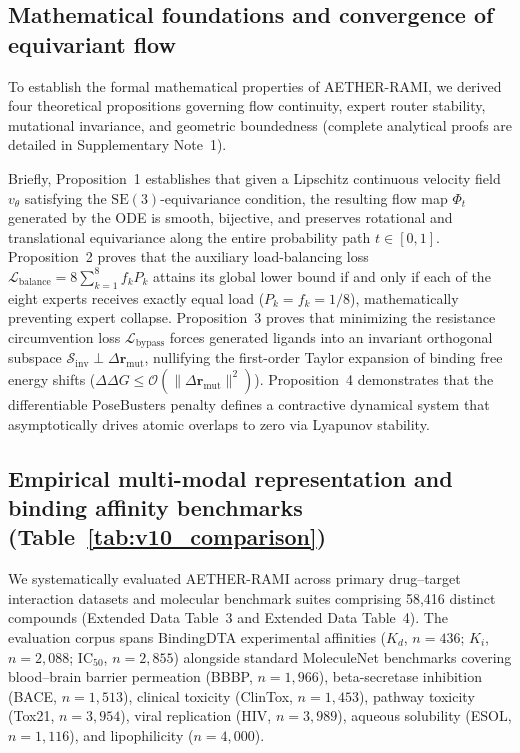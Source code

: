 \documentclass[11pt,a4paper]{article}
\begin{document}
\subsection*{Mathematical foundations and convergence of equivariant flow}
To establish the formal mathematical properties of AETHER-RAMI, we derived four theoretical propositions governing flow continuity, expert router stability, mutational invariance, and geometric boundedness (complete analytical proofs are detailed in Supplementary Note~1).

Briefly, Proposition~1 establishes that given a Lipschitz continuous velocity field $v_\theta$ satisfying the $\mathrm{SE}(3)$-equivariance condition, the resulting flow map $\Phi_t$ generated by the ODE is smooth, bijective, and preserves rotational and translational equivariance along the entire probability path $t \in [0, 1]$. Proposition~2 proves that the auxiliary load-balancing loss $\mathcal{L}_{\text{balance}} = 8 \sum_{k=1}^8 f_k P_k$ attains its global lower bound if and only if each of the eight experts receives exactly equal load ($P_k = f_k = 1/8$), mathematically preventing expert collapse. Proposition~3 proves that minimizing the resistance circumvention loss $\mathcal{L}_{\text{bypass}}$ forces generated ligands into an invariant orthogonal subspace $\mathcal{S}_{\text{inv}} \perp \Delta \mathbf{r}_{\text{mut}}$, nullifying the first-order Taylor expansion of binding free energy shifts ($\Delta \Delta G \le \mathcal{O}(\|\Delta \mathbf{r}_{\text{mut}}\|^2)$). Proposition~4 demonstrates that the differentiable PoseBusters penalty defines a contractive dynamical system that asymptotically drives atomic overlaps to zero via Lyapunov stability.

\subsection*{Empirical multi-modal representation and binding affinity benchmarks (Table~\ref{tab:v10_comparison})}


We systematically evaluated AETHER-RAMI across primary drug--target interaction datasets and molecular benchmark suites comprising 58,416 distinct compounds (Extended Data Table~3 and Extended Data Table~4). The evaluation corpus spans BindingDTA experimental affinities ($K_d$, $n=436$; $K_i$, $n=2,088$; $\text{IC}_{50}$, $n=2,855$) alongside standard MoleculeNet benchmarks covering blood--brain barrier permeation (BBBP, $n=1,966$), beta-secretase inhibition (BACE, $n=1,513$), clinical toxicity (ClinTox, $n=1,453$), pathway toxicity (Tox21, $n=3,954$), viral replication (HIV, $n=3,989$), aqueous solubility (ESOL, $n=1,116$), and lipophilicity ($n=4,000$).
\end{document}
